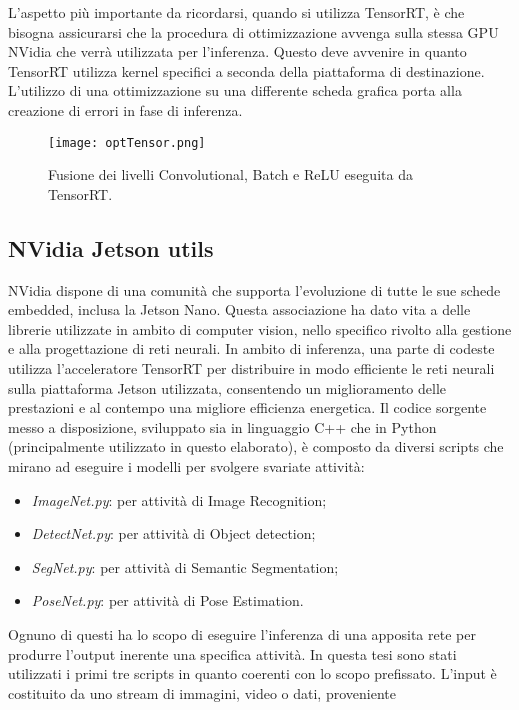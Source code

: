 L'aspetto più importante da ricordarsi, quando si utilizza TensorRT, è che 
bisogna assicurarsi che la procedura di ottimizzazione avvenga sulla stessa 
GPU NVidia che verrà utilizzata per l'inferenza. Questo deve avvenire 
in quanto TensorRT utilizza kernel specifici a seconda della piattaforma 
di destinazione. L'utilizzo di una ottimizzazione su una differente scheda 
grafica porta alla creazione di errori in fase di inferenza. 
\begin{figure}
    \centering
    \texttt{[image: optTensor.png]}
    \centering
    \caption{Fusione dei livelli Convolutional, Batch e ReLU eseguita da TensorRT.}
    \label{fusion_tensorrt}
\end{figure}

\subsection{NVidia Jetson utils}\label{utils}
NVidia dispone di una comunità che supporta l'evoluzione di tutte le sue schede 
embedded, inclusa la Jetson Nano. Questa associazione ha dato vita 
a delle librerie utilizzate in ambito di computer vision, nello specifico rivolto 
alla gestione e alla  progettazione di reti neurali. In ambito di inferenza, una 
parte di codeste utilizza l'acceleratore TensorRT per distribuire in modo 
efficiente le reti neurali sulla piattaforma Jetson utilizzata, consentendo 
un miglioramento delle prestazioni e al contempo una migliore efficienza 
energetica. Il codice sorgente messo a disposizione, sviluppato sia in linguaggio 
C++ che in Python (principalmente utilizzato in questo elaborato), 
è composto da diversi scripts che mirano ad eseguire i modelli per svolgere 
svariate attività:
\begin{itemize}
    \item \emph{ImageNet.py}: per attività di Image Recognition;
    \item \emph{DetectNet.py}: per attività di Object detection;
    \item \emph{SegNet.py}: per attività di Semantic Segmentation;
    \item \emph{PoseNet.py}: per attività di Pose Estimation.
\end{itemize}
Ognuno di questi ha lo scopo di eseguire l'inferenza di una apposita rete 
per produrre l'output inerente una specifica attività. In questa tesi sono 
stati utilizzati i primi tre scripts in quanto coerenti con lo scopo prefissato. 
L'input è costituito da uno stream di immagini, video o dati, proveniente 
